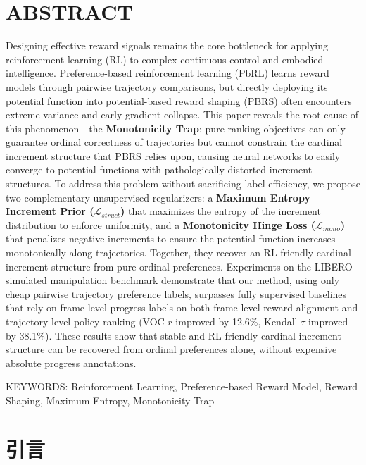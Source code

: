 \section*{ABSTRACT}
Designing effective reward signals remains the core bottleneck for applying reinforcement learning (RL) to complex continuous control and embodied intelligence. Preference-based reinforcement learning (PbRL) learns reward models through pairwise trajectory comparisons, but directly deploying its potential function into potential-based reward shaping (PBRS) often encounters extreme variance and early gradient collapse. This paper reveals the root cause of this phenomenon---the \textbf{Monotonicity Trap}: pure ranking objectives can only guarantee ordinal correctness of trajectories but cannot constrain the cardinal increment structure that PBRS relies upon, causing neural networks to easily converge to potential functions with pathologically distorted increment structures. To address this problem without sacrificing label efficiency, we propose two complementary unsupervised regularizers: a \textbf{Maximum Entropy Increment Prior ($\mathcal{L}_{struct}$)} that maximizes the entropy of the increment distribution to enforce uniformity, and a \textbf{Monotonicity Hinge Loss ($\mathcal{L}_{mono}$)} that penalizes negative increments to ensure the potential function increases monotonically along trajectories. Together, they recover an RL-friendly cardinal increment structure from pure ordinal preferences. Experiments on the LIBERO simulated manipulation benchmark demonstrate that our method, using only cheap pairwise trajectory preference labels, surpasses fully supervised baselines that rely on frame-level progress labels on both frame-level reward alignment and trajectory-level policy ranking (VOC $r$ improved by 12.6\%, Kendall $\tau$ improved by 38.1\%). These results show that stable and RL-friendly cardinal increment structure can be recovered from ordinal preferences alone, without expensive absolute progress annotations.

\vspace{1em}\noindent
{\hei KEYWORDS:}
{\songti \rmfamily Reinforcement Learning, Preference-based Reward Model, Reward Shaping, Maximum Entropy, Monotonicity Trap}

\clearpage



\setcounter{page}{1}

\section{引言}


